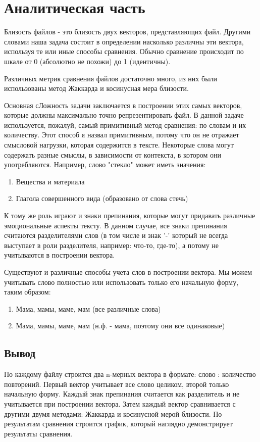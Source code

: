 \chapter{Аналитическая часть}

Близость файлов - это близость двух векторов, представляющих файл. Другими словами наша задача состоит в определении насколько различны эти вектора, 
используя те или иные способы сравнения. Обычно сравнение происходит по шкале от 0 (абсолютно не похожи) до 1 (идентичны). 

Различных метрик сравнения файлов достаточно много, из них были использованы метод Жаккарда и косинусная мера близости. 

Основная сЛожность задачи заключается в построении этих самых векторов, которые должны максимально точно репрезентировать файл. 
В данной задаче используется, пожалуй, самый примитивный метод сравнения: по словам и их количеству. Этот способ я назвал примитивным, 
потому что он не отражает смысловой нагрузки, которая содержится в тексте. Некоторые слова могут содержать разные смыслы, в зависимости от контекста, 
в котором они употребляются. Например, слово "стекло" может иметь значения:
\begin{enumerate}
    \item Вещества и материала
    \item Глагола совершенного вида (образовано от слова стечь)
\end{enumerate}
К тому же роль играют и знаки препинания, которые могут придавать различные эмоциональные аспекты тексту. 
В данном случае, все знаки препинания считаются разделителями слов (в том числе и знак '-' который не всегда выступает в роли разделителя, например: что-то, где-то),
а потому не учитываются в построении вектора.

Существуют и различные способы учета слов в построении вектора. Мы можем учитывать слово полностью или использовать только его начальную форму, таким образом:
\begin{enumerate}
    \item Мама, мамы, маме, мам (все различные слова)
    \item Мама, мамы, маме, мам (н.ф. - мама, поэтому они все одинаковые)
\end{enumerate}

\section*{Вывод}

По каждому файлу строится два n-мерных вектора в формате: {слово : количество повторений}. 
Первый вектор учитывает все слово целиком, второй только начальную форму. Каждый знак препинания считается как разделитель и не учитывается при построении вектора.
Затем каждый вектор сравнивается с другими двумя методами: Жаккарда и косинусной мерой близости. 
По результатам сравнения строится график, который наглядно демонстрирует результаты сравнения.

\clearpage

